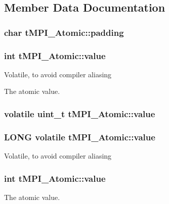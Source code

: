 \subsection{\-Member \-Data \-Documentation}
\hypertarget{structtMPI__Atomic_a0bc95c8497ce76b08ed964d06fe5142d}{
\subsubsection[{padding}]{\setlength{\rightskip}{0pt plus 5cm}char {\bf t\-M\-P\-I\-\_\-\-Atomic\-::padding}}}\label{structtMPI__Atomic_a0bc95c8497ce76b08ed964d06fe5142d}
\hypertarget{structtMPI__Atomic_a251089827c7a504b91e5a0f390c2c5e6}{
\subsubsection[{value}]{\setlength{\rightskip}{0pt plus 5cm}int {\bf t\-M\-P\-I\-\_\-\-Atomic\-::value}}}\label{structtMPI__Atomic_a251089827c7a504b91e5a0f390c2c5e6}
\-Volatile, to avoid compiler aliasing

\-The atomic value. \hypertarget{structtMPI__Atomic_a98e7b83d2063a810b3fa8eb7c848e915}{
\subsubsection[{value}]{\setlength{\rightskip}{0pt plus 5cm}volatile uint\-\_\-t {\bf t\-M\-P\-I\-\_\-\-Atomic\-::value}}}\label{structtMPI__Atomic_a98e7b83d2063a810b3fa8eb7c848e915}
\hypertarget{structtMPI__Atomic_a0d0d30f68431ff5be90b7913cca5c662}{
\subsubsection[{value}]{\setlength{\rightskip}{0pt plus 5cm}\-L\-O\-N\-G volatile {\bf t\-M\-P\-I\-\_\-\-Atomic\-::value}}}\label{structtMPI__Atomic_a0d0d30f68431ff5be90b7913cca5c662}
\-Volatile, to avoid compiler aliasing \hypertarget{structtMPI__Atomic_a251089827c7a504b91e5a0f390c2c5e6}{
\subsubsection[{value}]{\setlength{\rightskip}{0pt plus 5cm}int {\bf t\-M\-P\-I\-\_\-\-Atomic\-::value}}}\label{structtMPI__Atomic_a251089827c7a504b91e5a0f390c2c5e6}
\-The atomic value. 

